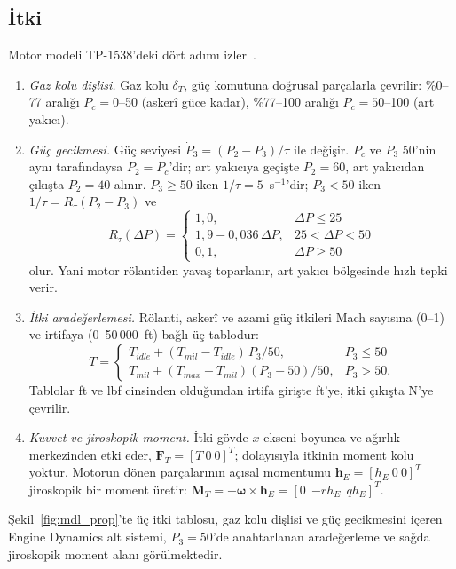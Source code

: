 \documentclass[conf]{new-aiaa}
\begin{document}
\subsection{İtki}
Motor modeli TP-1538'deki dört adımı izler~\cite{tp1538}.
\begin{enumerate}
\item \emph{Gaz kolu dişlisi.} Gaz kolu $\delta_T$, güç komutuna doğrusal parçalarla çevrilir: \%0--77 aralığı $P_c=0$--50 (askerî güce kadar), \%77--100 aralığı $P_c=50$--100 (art yakıcı).
\item \emph{Güç gecikmesi.} Güç seviyesi $\dot P_3=(P_2-P_3)/\tau$ ile değişir. $P_c$ ve $P_3$ 50'nin aynı tarafındaysa $P_2=P_c$'dir; art yakıcıya geçişte $P_2=60$, art yakıcıdan çıkışta $P_2=40$ alınır. $P_3\ge50$ iken $1/\tau=5$~s$^{-1}$'dir; $P_3<50$ iken $1/\tau=R_\tau(P_2-P_3)$ ve
\begin{equation}
R_\tau(\Delta P)=\begin{cases}1,0, & \Delta P\le25\\ 1,9-0,036\,\Delta P, & 25<\Delta P<50\\ 0,1, & \Delta P\ge50\end{cases}
\end{equation}
olur. Yani motor rölantiden yavaş toparlanır, art yakıcı bölgesinde hızlı tepki verir.
\item \emph{İtki aradeğerlemesi.} Rölanti, askerî ve azami güç itkileri Mach sayısına (0--1) ve irtifaya (0--50\,000~ft) bağlı üç tablodur:
\begin{equation}
T=\begin{cases}T_{idle}+(T_{mil}-T_{idle})\,P_3/50, & P_3\le50\\ T_{mil}+(T_{max}-T_{mil})(P_3-50)/50, & P_3>50.\end{cases}
\end{equation}
Tablolar ft ve lbf cinsinden olduğundan irtifa girişte ft'ye, itki çıkışta N'ye çevrilir.
\item \emph{Kuvvet ve jiroskopik moment.} İtki gövde $x$ ekseni boyunca ve ağırlık merkezinden etki eder, $\mathbf F_T=[T\ 0\ 0]^T$; dolayısıyla itkinin moment kolu yoktur. Motorun dönen parçalarının açısal momentumu $\mathbf h_E=[h_E\ 0\ 0]^T$ jiroskopik bir moment üretir: $\mathbf M_T=-\boldsymbol\omega\times\mathbf h_E=[0\ \ {-r}h_E\ \ qh_E]^T$.
\end{enumerate}
Şekil~\ref{fig:mdl_prop}'te üç itki tablosu, gaz kolu dişlisi ve güç gecikmesini içeren Engine Dynamics alt sistemi, $P_3=50$'de anahtarlanan aradeğerleme ve sağda jiroskopik moment alanı görülmektedir.
\end{document}

